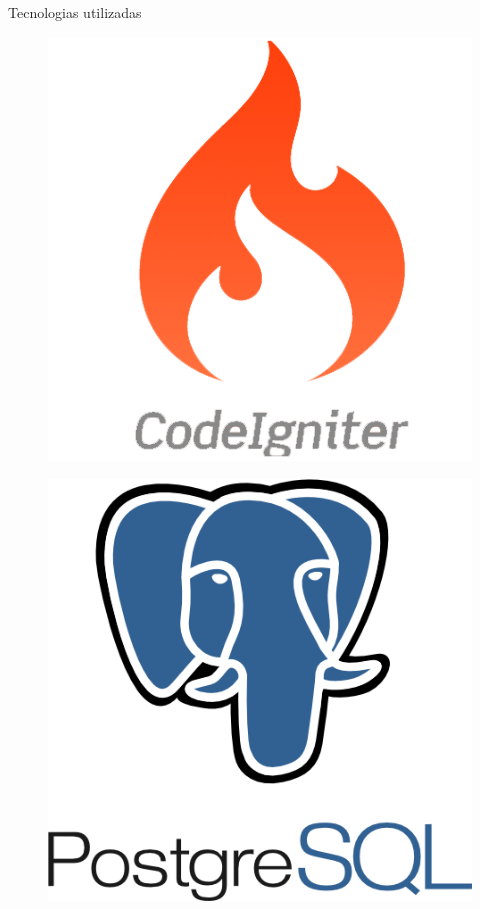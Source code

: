 \documentclass[10pt]{beamer}
\begin{document}
\begin{frame}{Tecnologias utilizadas}
\begin{multicols}{3}
\begin{figure}
            \includegraphics[width=\linewidth]{demo/images/codeigniter.png}
            \label{fig:pandas}
        \end{figure}
        \begin{figure}
            \centering
            \includegraphics[width=\linewidth]{demo/images/postgresql.png}
            \label{fig:python}
        \end{figure}
    \end{multicols}
\end{frame}
\end{document}
